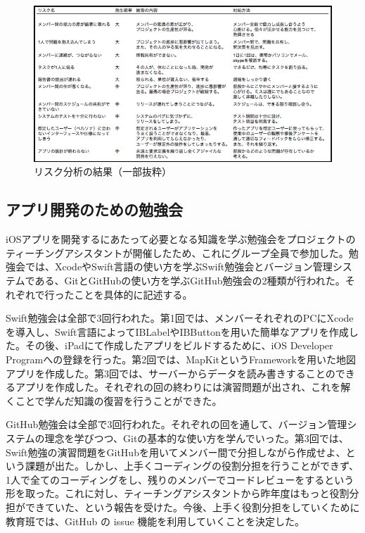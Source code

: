 \documentclass[openany,11pt,papersize]{jsbook}
\begin{document}
\begin{figure}[H]
\begin{center}
\includegraphics[width=14cm, bb=0 0 753 394]{img/RiskManagement.png}
\end{center}
\caption{リスク分析の結果（一部抜粋）}
\end{figure}


\subsection{アプリ開発のための勉強会}
\par iOSアプリを開発するにあたって必要となる知識を学ぶ勉強会をプロジェクトのティーチングアシスタントが開催したため、これにグループ全員で参加した。勉強会では、XcodeやSwift言語の使い方を学ぶSwift勉強会とバージョン管理システムである、GitとGitHubの使い方を学ぶGitHub勉強会の2種類が行われた。それぞれで行ったことを具体的に記述する。
\par Swift勉強会は全部で3回行われた。第1回では、メンバーそれぞれのPCにXcodeを導入し、Swift言語によってIBLabelやIBButtonを用いた簡単なアプリを作成した。その後、iPadにて作成したアプリをビルドするために、iOS Developer Programへの登録を行った。第2回では、MapKitというFrameworkを用いた地図アプリを作成した。第3回では、サーバーからデータを読み書きすることのできるアプリを作成した。それぞれの回の終わりには演習問題が出され、これを解くことで学んだ知識の復習を行うことができた。
\par GitHub勉強会は全部で3回行われた。それぞれの回を通して、バージョン管理システムの理念を学びつつ、Gitの基本的な使い方を学んでいった。第3回では、Swift勉強の演習問題をGitHubを用いてメンバー間で分担しながら作成せよ、という課題が出た。しかし、上手くコーディングの役割分担を行うことができず、1人で全てのコーディングをし、残りのメンバーでコードレビューをするという形を取った。これに対し、ティーチングアシスタントから昨年度はもっと役割分担ができていた、という報告を受けた。今後、上手く役割分担をしていくために教育班では、GitHub の issue 機能を利用していくことを決定した。
\end{document}

